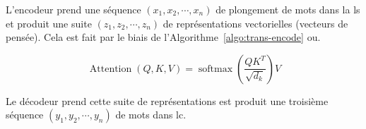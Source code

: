 L'encodeur prend une séquence \((x_1, x_2, \cdots, x_n)\) de plongement de mots dans la \Acrshort{ls} 
et produit une suite \((z_1, z_2, \cdots, z_n)\) de représentations vectorielles (vecteurs de pensée).
Cela est fait par le biais de l'Algorithme~\ref{algo:trans-encode} ou.

\[
    \operatorname{Attention}(Q, K, V)=\operatorname{softmax}\left(\frac{Q K^T}{\sqrt{d_k}}\right) V
\]
    
    



Le décodeur prend cette suite de représentations est produit une troisième séquence 
\((y_1, y_2, \cdots, y_n)\)
de mots dans \acrshort{lc}.
